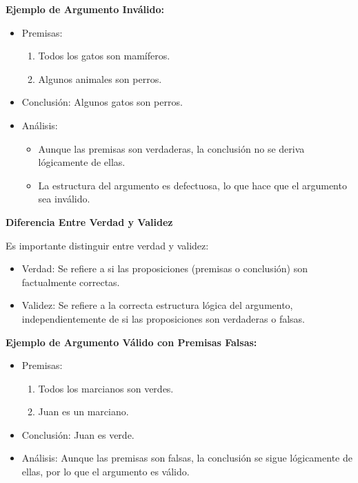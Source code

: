 \textbf{Ejemplo de Argumento Inválido:}
\begin{itemize}
   \item Premisas:
         \begin{enumerate}
            \item Todos los gatos son mamíferos.
            \item Algunos animales son perros.
         \end{enumerate}
   \item Conclusión: Algunos gatos son perros.
   \item Análisis:
         \begin{itemize}
            \item Aunque las premisas son verdaderas, la conclusión no se deriva lógicamente de ellas.
            \item La estructura del argumento es defectuosa, lo que hace que el argumento sea inválido.
         \end{itemize}
\end{itemize}


\textbf{Diferencia Entre Verdad y Validez}

Es importante distinguir entre verdad y validez:

\begin{itemize}
   \item Verdad: Se refiere a si las proposiciones (premisas o conclusión) son factualmente correctas.
   \item Validez: Se refiere a la correcta estructura lógica del argumento, independientemente de si las proposiciones son verdaderas o falsas.
\end{itemize}

\textbf{Ejemplo de Argumento Válido con Premisas Falsas:}

\begin{itemize}
   \item Premisas:
         \begin{enumerate}
            \item Todos los marcianos son verdes.
            \item Juan es un marciano.
         \end{enumerate}
   \item Conclusión: Juan es verde.
   \item Análisis: Aunque las premisas son falsas, la conclusión se sigue lógicamente de ellas, por lo que el argumento es válido.
\end{itemize}



